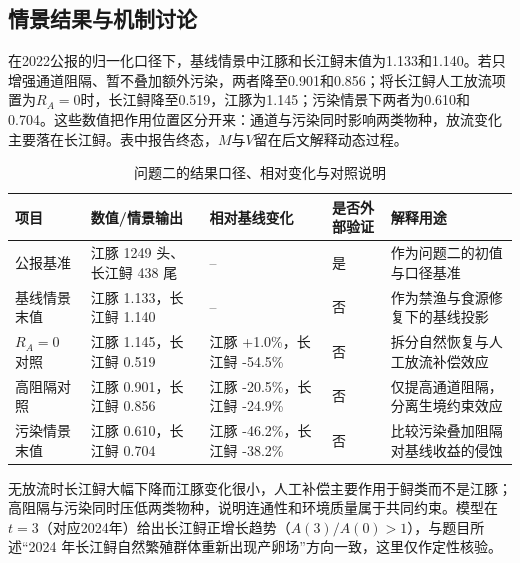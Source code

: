 \subsection{情景结果与机制讨论}
在2022公报的归一化口径下，基线情景中江豚和长江鲟末值为1.133和1.140。若只增强通道阻隔、暂不叠加额外污染，两者降至0.901和0.856；将长江鲟人工放流项置为$R_A=0$时，长江鲟降至0.519，江豚为1.145；污染情景下两者为0.610和0.704。这些数值把作用位置区分开来：通道与污染同时影响两类物种，放流变化主要落在长江鲟。表中报告终态，$M$与$V$留在后文解释动态过程。
\begin{table}[htbp]
\centering
\caption{问题二的结果口径、相对变化与对照说明}
\label{tab:q2_result}
\begin{tabularx}{0.95\textwidth}{>{\raggedright\arraybackslash}p{2.2cm} >{\raggedright\arraybackslash}p{3.6cm} >{\raggedright\arraybackslash}p{2.8cm} >{\raggedright\arraybackslash}p{1.7cm} X}
\toprule
项目 & 数值/情景输出 & 相对基线变化 & 是否外部验证 & 解释用途 \\
\midrule
2022 公报基准 & 江豚 1249 头、长江鲟 438 尾 & -- & 是 & 作为问题二的初值与口径基准 \\
基线情景末值 & 江豚 1.133，长江鲟 1.140 & -- & 否 & 作为禁渔与食源修复下的基线投影 \\
$R_A=0$ 对照 & 江豚 1.145，长江鲟 0.519 & 江豚 +1.0\%，长江鲟 -54.5\% & 否 & 拆分自然恢复与人工放流补偿效应 \\
高阻隔对照 & 江豚 0.901，长江鲟 0.856 & 江豚 -20.5\%，长江鲟 -24.9\% & 否 & 仅提高通道阻隔，分离生境约束效应 \\
污染情景末值 & 江豚 0.610，长江鲟 0.704 & 江豚 -46.2\%，长江鲟 -38.2\% & 否 & 比较污染叠加阻隔对基线收益的侵蚀 \\
\bottomrule
\end{tabularx}
\end{table}
无放流时长江鲟大幅下降而江豚变化很小，人工补偿主要作用于鲟类而不是江豚；高阻隔与污染同时压低两类物种，说明连通性和环境质量属于共同约束。模型在$t=3$（对应2024年）给出长江鲟正增长趋势（$A(3)/A(0)>1$），与题目所述“2024 年长江鲟自然繁殖群体重新出现产卵场”方向一致，这里仅作定性核验。

